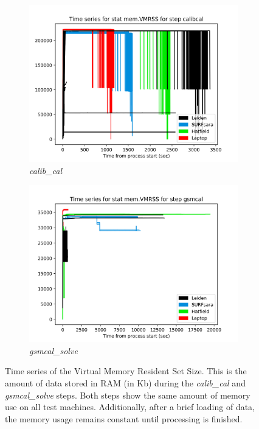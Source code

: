 \begin{figure}
  \centering
   \begin{subfigure}{.45\textwidth}
    \includegraphics[width=\textwidth]{ch4/figures/fig10/calibcal_vmrss.png}
      \caption{\textit{calib\_cal} }
	\label{fig:ch4_calib_cal_VMRSS}
 \end{subfigure}%
 \begin{subfigure}{.45\textwidth}
    \includegraphics[width=\textwidth]{ch4/figures/fig10/gsmcal_vmrss.png}
      \caption{\textit{gsmcal\_solve}}
	\label{fig:ch4_fitclock_VMRSS}
 \end{subfigure}
    \caption[Time series of the Virtual Memory Resident Set Size]{Time series of the Virtual Memory Resident Set Size. This is the amount of data stored in RAM (in Kb) during the \textit{calib\_cal} and \textit{gsmcal\_solve} steps. Both steps show the same amount of memory use on all test machines. Additionally, after a brief loading of data, the memory usage remains constant until processing is finished. }
 \label{fig:ch4_VMRSS}
\end{figure}

